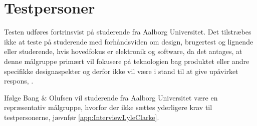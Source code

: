 \section{Testpersoner}
\label{TestpersonerValgAfGestikker}
%
Testen udføres fortrinsvist på studerende fra Aalborg Universitet. Det tilstræbes ikke at teste på studerende med forhåndsviden om design, brugertest og lignende eller studerende, hvis hovedfokus er elektronik og software, da det antages, at denne målgruppe primært vil fokusere på teknologien bag produktet eller andre specifikke designaspekter og derfor ikke vil være i stand til at give upåvirket respons, \parencite[s. 110]{Book:OUE}. 

Ifølge Bang $\&$ Olufsen vil studerende fra Aalborg Universitet være en repræsentativ målgruppe, hvorfor der ikke sættes yderligere krav til testpersonerne, jævnfør \autoref{app:InterviewLyleClarke}.  
%
